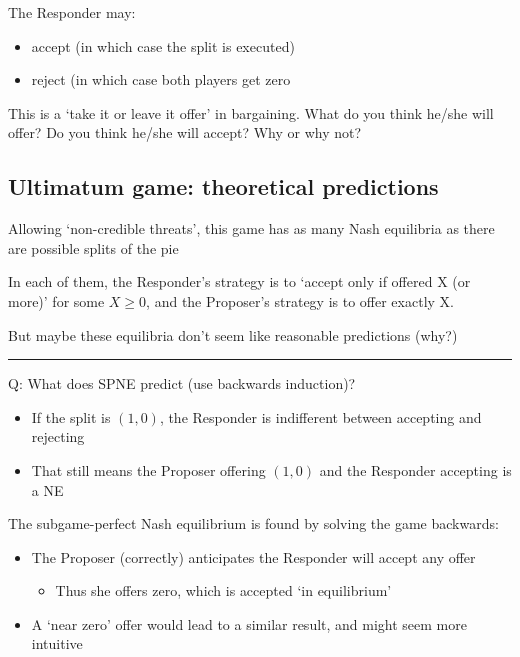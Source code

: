 \documentclass[]{article}
\providecommand{\tightlist}{%
  \setlength{\itemsep}{0pt}\setlength{\parskip}{0pt}}
\begin{document}
The Responder may:

\begin{itemize}
\tightlist
\item
  accept (in which case the split is executed)
\item
  reject (in which case both players get zero
\end{itemize}

This is a `take it or leave it offer' in bargaining. What do you think
he/she will offer? Do you think he/she will accept? Why or why not?

\hypertarget{ultimatum-game-theoretical-predictions}{%
\subsection{Ultimatum game: theoretical
predictions}\label{ultimatum-game-theoretical-predictions}}

Allowing `non-credible threats', this game has as many Nash equilibria
as there are possible splits of the pie

In each of them, the Responder's strategy is to `accept only if offered
X (or more)' for some \(X\geq0\), and the Proposer's strategy is to
offer exactly X.

But maybe these equilibria don't seem like reasonable predictions (why?)

\begin{center}\rule{0.5\linewidth}{\linethickness}\end{center}

Q: What does SPNE predict (use backwards induction)?

\begin{itemize}
\item
  If the split is \((1,0)\), the Responder is indifferent between
  accepting and rejecting
\item
  That still means the Proposer offering \((1,0)\) and the Responder
  accepting is a NE
\end{itemize}

The subgame-perfect Nash equilibrium is found by solving the game
backwards:

\begin{itemize}
\tightlist
\item
  The Proposer (correctly) anticipates the Responder will accept any
  offer

  \begin{itemize}
  \tightlist
  \item
    Thus she offers zero, which is accepted `in equilibrium'
  \end{itemize}
\item
  A `near zero' offer would lead to a similar result, and might seem
  more intuitive
\end{itemize}
\end{document}
